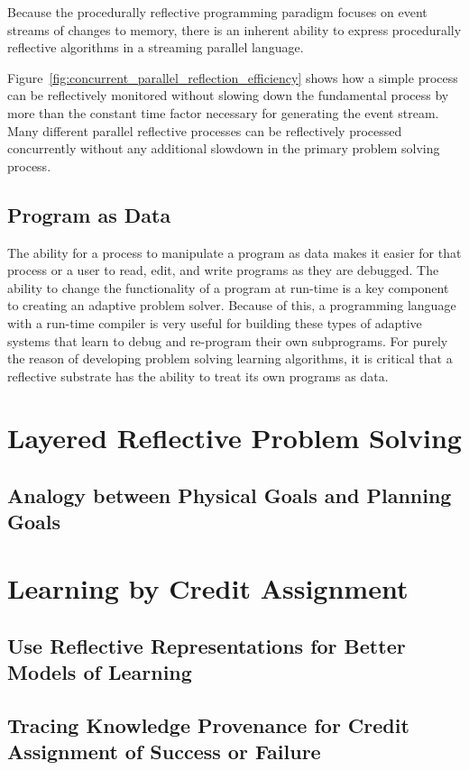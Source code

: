 Because the procedurally reflective programming paradigm focuses on
event streams of changes to memory, there is an inherent ability to
express procedurally reflective algorithms in a streaming parallel
language.

Figure~\ref{fig:concurrent_parallel_reflection_efficiency} shows how a
simple process can be reflectively monitored without slowing down the
fundamental process by more than the constant time factor necessary
for generating the event stream.  Many different parallel reflective
processes can be reflectively processed concurrently without any
additional slowdown in the primary problem solving process.

\subsection{Program as Data}

The ability for a process to manipulate a program as data makes it
easier for that process or a user to read, edit, and write programs as
they are debugged.  The ability to change the functionality of a
program at run-time is a key component to creating an adaptive problem
solver.  Because of this, a programming language with a run-time
compiler is very useful for building these types of adaptive systems
that learn to debug and re-program their own subprograms.  For purely
the reason of developing problem solving learning algorithms, it is
critical that a reflective substrate has the ability to treat its own
programs as data.


\section{Layered Reflective Problem Solving}

\subsection{Analogy between Physical Goals and Planning Goals}


\section{Learning by Credit Assignment}

\subsection{Use Reflective Representations for Better Models of Learning}

\subsection{Tracing Knowledge Provenance for Credit Assignment of Success or Failure}



